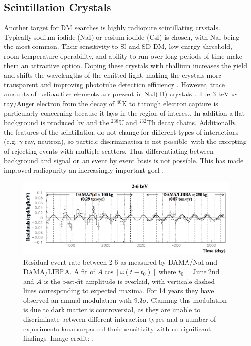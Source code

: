 \subsection{Scintillation Crystals}
\label{subsec:crystals}
Another target for DM searches is highly radiopure scintillating crystals.  Typically sodium iodide (NaI) or cesium iodide (CsI) is
chosen, with NaI being the most common.  Their sensitivity to SI
and SD DM, low energy threshold, room temperature operability, and ability to run over long periods of time
make them an attractive option.  Doping these crystals with thallium increases the yield and shifts the wavelengths of the emitted light,
making the crystals
more transparent and improving phototube detection efficiency .  However, trace amounts of radioactive elements
are present in NaI(Tl) crystals .  The 3 keV x-ray/Auger electron from the decay of
$^{40}$K to  through electron capture is particularly concerning because it lays in the region of interest.  In addition a
flat background is produced by  and the $^{238}$U and $^{232}$Th decay chains.  Additionally, the features of the
scintillation
do not change for different types of interactions (e.g. $\gamma$-ray, neutron), so particle discrimination is not possible, with the
excepting of rejecting events with multiple scatters.  Thus differentiating between background and signal on an event by event basis is
not possible.  This has made improved radiopurity an increasingly important goal .

\begin{figure}
\centering
\includegraphics[width=\textwidth]{DAMAModulation}
\caption{Residual event rate between 2-6 \kevee as measured by DAMA/NaI and DAMA/LIBRA.  A fit of $A \cos [\omega (t - t_{0})]$ where
$t_{0} = \mathrm{June\ 2nd}$ and $A$ is the best-fit amplitude is overlaid, with verticale dashed lines corresponding to expected
maxima.  For 14 years they have observed an annual
modulation with $9.3\sigma$.  Claiming this modulation is due to dark matter is controversial, as they are unable to
discriminate between different interaction types and a number of experiments have surpassed their sensitivity with no significant
findings.  Image credit: .}
\label{fig:dama}
\end{figure}

